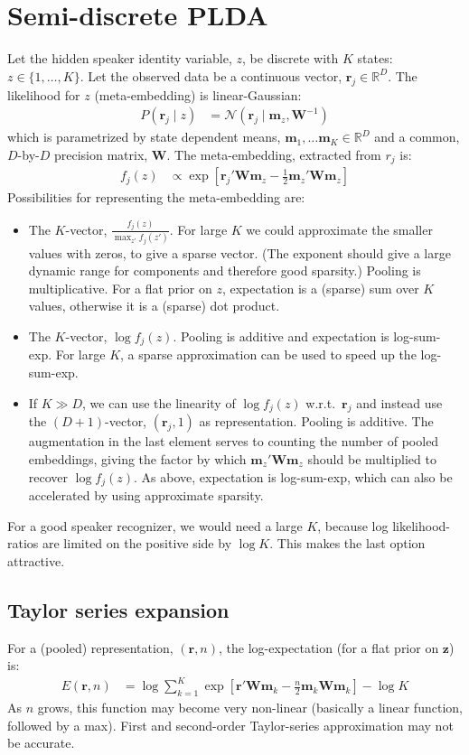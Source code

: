 \documentclass[a4paper,oneside,12pt,english]{report}
\def\zvec{\mathbf{z}}
\def\ND{\mathcal{N}}
\def\R{\mathbb{R}}
\def\Wmat{\mathbf{W}}
\def\mvec{\mathbf{m}}
\def\rvec{\mathbf{r}}
\begin{document}
\section{Semi-discrete PLDA}
Let the hidden speaker identity variable, $z$, be discrete with $K$ states: $z\in\{1,\ldots,K\}$. Let the observed data be a continuous vector, $\rvec_j\in\R^D$. The likelihood for $z$ (meta-embedding) is linear-Gaussian:
\begin{align}
P(\rvec_j\mid z) &= \ND(\rvec_j\mid\mvec_z,\Wmat^{-1})
\end{align}
which is parametrized by state dependent means, $\mvec_1,\ldots\mvec_K\in\R^D$ and a common, $D$-by-$D$ precision matrix, $\Wmat$. The meta-embedding, extracted from $r_j$ is:
\begin{align}
f_j(z) &\propto \exp[\rvec_j'\Wmat\mvec_z - \frac12 \mvec_z'\Wmat\mvec_z]
\end{align}
Possibilities for representing the meta-embedding are:
\begin{itemize}
	\item The $K$-vector, $\frac{f_j(z)}{\max_{z'} f_j(z')}$. For large $K$ we could approximate the smaller values with zeros, to give a sparse vector. (The exponent should give a large dynamic range for components and therefore good sparsity.) Pooling is multiplicative. For a flat prior on $z$, expectation is a (sparse) sum over $K$ values, otherwise it is a (sparse) dot product.
	\item The $K$-vector, $\log f_j(z)$. Pooling is additive and expectation is log-sum-exp. For large $K$, a sparse approximation can be used to speed up the log-sum-exp.
	\item If $K\gg D$, we can use the linearity of $\log f_j(z)$ w.r.t.\ $\rvec_j$ and instead use the $(D+1)$-vector, $(\rvec_j,1)$ as representation. Pooling is additive. The augmentation in the last element serves to counting the number of pooled embeddings, giving the factor by which $\mvec_z'\Wmat\mvec_z$ should be multiplied to recover $\log f_j(z)$. As above, expectation is log-sum-exp, which can also be accelerated by using approximate sparsity.
\end{itemize}
For a good speaker recognizer, we would need a large $K$, because log likelihood-ratios are limited on the positive side by $\log K$. This makes the last option attractive.


\subsection{Taylor series expansion}
For a (pooled) representation, $(\rvec,n)$, the log-expectation (for a flat prior on $\zvec$) is:
\begin{align}
E(\rvec,n) &= \log\sum_{k=1}^K \exp[\rvec'\Wmat\mvec_k -\frac{n}2\mvec_k\Wmat\mvec_k] -\log K
\end{align}
As $n$ grows, this function may become very non-linear (basically a linear function, followed by a max). First and second-order Taylor-series approximation may not be accurate.
\end{document}
